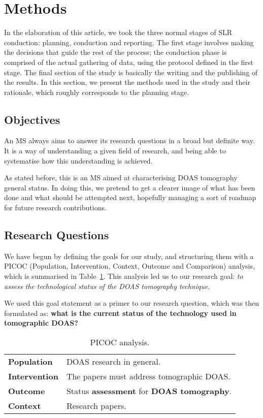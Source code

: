 
\section{Methods}\label{sec:methods}

In the elaboration of this article, we took the three normal stages of
SLR conduction: planning, conduction and reporting. The first stage
involves making the decisions that guide the rest of the process; the
conduction phase is comprised of the actual gathering of data, using the
protocol defined in the first stage. The final section of the study is
basically the writing and the publishing of the results. In this
section, we present the methods used in the study and their rationale,
which roughly corresponds to the planning stage.

\subsection{Objectives}
\label{sub:objectives}

An MS always aims to answer its research questions in a broad but
definite way. It is a way of understanding a given field of research,
and being able to systematise how this understanding is achieved.

As stated before, this is an MS aimed at characterising DOAS tomography
general status. In doing this, we pretend to get a clearer image of what
has been done and what should be attempted next, hopefully managing a
sort of roadmap for future research contributions.

\subsection{Research Questions}
\label{sub:research_questions_and_search_queries}

We have begun by defining the goals for our study, and structuring them
with a PICOC (Population, Intervention, Context, Outcome and Comparison)
analysis, which is summarised in Table~\ref{tab:picoc}. This analysis
led us to our research goal: \textit{to assess the technological status
    of the DOAS tomography technique}.
    
We used this goal statement as a primer to our research question,
which was then formulated as: \textbf{what is the current status of
the technology used in tomographic DOAS?}

\begin{table}[htb]
\small
\centering
\caption{PICOC analysis.}
\label{tab:picoc}
\begin{tabular}{@{}ll@{}}
\toprule
\textbf{Population} & DOAS research in general.\\ 
\textbf{Intervention} & The papers must address tomographic DOAS.\\
\textbf{Outcome} & Status \textbf{assessment} for \textbf{DOAS tomography}.\\
\textbf{Context} & Research papers.\\\bottomrule
\end{tabular}
\end{table}

